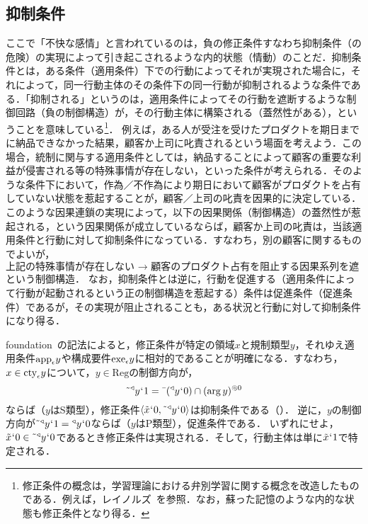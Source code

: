 \subsection{抑制条件}
\label{ssec:抑制条件}

ここで「不快な感情」と言われているのは，負の修正条件すなわち抑制条件（の危険）の実現によって引き起こされるような内的状態（情動）のことだ．抑制条件とは，ある条件（適用条件）下での行動によってそれが実現された場合に，それによって，同一行動主体のその条件下の同一行動が抑制されるような条件である．「抑制される」というのは，適用条件によってその行動を遮断するような制御回路（負の制御構造）が，その行動主体に構築される（蓋然性がある），ということを意味している\footnote{修正条件の概念は，学習理論における弁別学習に関する概念を改造したものである．例えば，レイノルズ~\cite[pp.\,8--12]{レイノルズ}を参照．なお，蘇った記憶のような内的な状態も修正条件となり得る．}．
例えば，ある人が受注を受けたプロダクトを期日までに納品できなかった結果，顧客か上司に叱責されるという場面を考えよう．この場合，統制に関与する適用条件としては，納品することによって顧客の重要な利益が侵害される等の特殊事情が存在しない，といった条件が考えられる．そのような条件下において，作為／不作為により期日において顧客がプロダクトを占有していない状態を惹起することが，顧客／上司の叱責を因果的に決定している．
このような因果連鎖の実現によって，以下の因果関係（制御構造）の蓋然性が惹起される，という因果関係が成立しているならば，顧客か上司の叱責は，当該適用条件と行動に対して抑制条件になっている．すなわち，別の顧客に関するものでよいが，
\[
   \text{上記の特殊事情が存在しない → 顧客のプロダクト占有を阻止する因果系列を遮断}
\]
という制御構造．
なお，抑制条件とは逆に，行動を促進する（適用条件によって行動が起動されるという正の制御構造を惹起する）条件は促進条件（促進条件）であるが，その実現が阻止されることも，ある状況と行動に対して抑制条件になり得る．

foundation~\cite{foundation}の記法によると，修正条件が特定の領域$x$と規制類型$y$，それゆえ適用条件$\mathrm{app}_{\epsilon}y$や構成要件$\mathrm{exe}_{\epsilon}y$に相対的であることが明確になる．すなわち，$ x\in\mathrm{cty}_{\epsilon}y $について，$y\in\mathrm{Reg}$の制御方向が，
\[
    \tilde{\:\:}{^\triangleleft}y{\mspace{1mu}{`}\mspace{1mu}} 1 = \bar{\:\:}({^\triangleleft}y{\mspace{1mu}{`}\mspace{1mu}} 0)\cap(\arg y)^{\circledcirc 0}
\]
ならば（$y$はS類型），修正条件$ \langle \tilde{x}{\mspace{1mu}{`}\mspace{1mu}} 0,\tilde{\:\:}{^\triangleleft}y{\mspace{1mu}{`}\mspace{1mu}} 0 \rangle $は抑制条件である（）．
逆に，$ y $の制御方向が$\tilde{\:\:}{^\triangleleft}y{\mspace{1mu}{`}\mspace{1mu}} 1 = {^\triangleleft}y{\mspace{1mu}{`}\mspace{1mu}} 0 $ならば（$y$はP類型），促進条件である．
いずれにせよ，$ \tilde{x}{\mspace{1mu}{`}\mspace{1mu}} 0\in\tilde{\:\:}{^\triangleleft}y{\mspace{1mu}{`}\mspace{1mu}} 0 $であるとき修正条件は実現される．そして，行動主体は単に$\tilde{x}{\mspace{1mu}{`}\mspace{1mu}} 1$で特定される．

